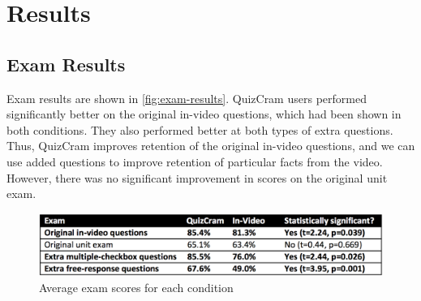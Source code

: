 \documentclass{sigchi}
\begin{document}
\section{Results}

\subsection{Exam Results}

Exam results are shown in \autoref{fig:exam-results}.  QuizCram users performed significantly better on the original in-video questions, which had been shown in both conditions. They also performed better at both types of extra questions. Thus, QuizCram improves retention of the original in-video questions, and we can use added questions to improve retention of particular facts from the video. However, there was no significant improvement in scores on the original unit exam. %

\begin{figure}
\centering
\includegraphics[width=1.0\columnwidth]{exam-results}
\caption{Average exam scores for each condition}
\label{fig:exam-results}
\end{figure}



\end{document}
